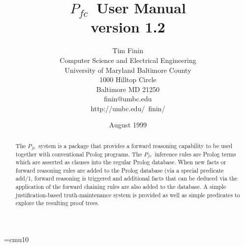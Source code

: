 
\setlength{\parindent}{0in}
\setlength{\parskip}{.2in}


\font\tenu=cmu10 %
\setlength{\textwidth}{6.5 in}
\setlength{\oddsidemargin}{0 in}
\setlength{\evensidemargin}{0 in}
\setlength{\topmargin}{-37 pt}
\setlength{\textheight}{9 in}


\pagestyle{headings}

\newcommand{\pfc}{$P_{fc}$}

\newcommand{\example}
   {\begin{quote}
    \small
    \setlength{\rightmargin}{0in}
    \begin{verbatim}}

\newcommand{\figline}{\centerline{\rule{\linewidth}{1pt}}}


\newenvironment{compactitemize}
    {\begin{itemize} \setlength{\itemsep}{-.05in} }{\end{itemize}}


\newcommand{\gloss}[1] {\subsubsection*{#1}}

\newcommand{\prolog}[1]{{\tt\bf {#1}}}



\title{\pfc\ User Manual\\version 1.2}
\author{
  Tim Finin\\
  Computer Science and Electrical Engineering\\
  University of Maryland Baltimore County\\
  1000 Hilltop Circle\\
  Baltimore MD 21250\\
  finin@umbc.edu\\
  http://umbc.edu/~finin/
}

\date{August 1999}
\maketitle

\begin{abstract}

The \pfc\ system is a package that provides a forward reasoning
capability to be used together with conventional Prolog programs.  The
\pfc\ inference rules are Prolog terms which are asserted as clauses
into the regular Prolog database.  When new facts or forward reasoning
rules are added to the Prolog database (via a special predicate add/1,
forward reasoning is triggered and additional facts that can be
deduced via the application of the forward chaining rules are also
added to the database.  A simple justification-based truth-maintenance
system is provided as well as simple predicates to explore the
resulting proof trees.  
\end{abstract}








